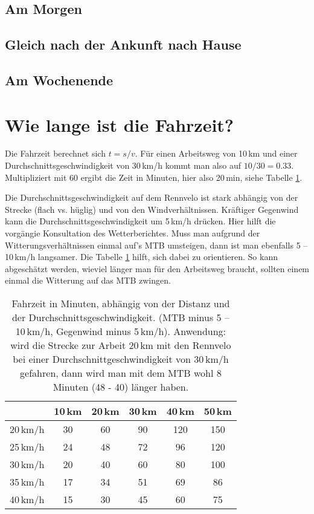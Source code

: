 \subsection{Am Morgen}

\subsection{Gleich nach der Ankunft nach Hause}

\subsection{Am Wochenende}




\section{Wie lange ist die Fahrzeit?}

Die Fahrzeit berechnet sich $t = s/v$.
Für einen Arbeitsweg von 10\,km und einer Durchschnittsgeschwindigkeit von 30\,km/h kommt man also auf $10/30=0.33$.
Multipliziert mit 60 ergibt die Zeit in Minuten, hier also 20\,min, siehe Tabelle \ref{tab:fahrzeit}.

Die Durchschnittsgeschwindigkeit auf dem Rennvelo ist stark abhängig von der Strecke (flach vs. hüglig) und von den Windverhältnissen.
Kräftiger Gegenwind kann die Durchschnittsgeschwindigkeit um 5\,km/h drücken.
Hier hilft die vorgängie Konsultation des Wetterberichtes.
Muss man aufgrund der Witterungsverhältnissen einmal auf's MTB umsteigen, dann ist man ebenfalls 5 -- 10\,km/h langsamer.
Die Tabelle \ref{tab:fahrzeit} hilft, sich dabei zu orientieren.
So kann abgeschätzt werden, wieviel länger man für den Arbeitsweg braucht,
sollten einem einmal die Witterung auf das MTB zwingen.

\begin{table}
        \centering
        \begin{tabular}{cccccc}
                \toprule
            &	10\,km	&   20\,km	& 30\,km	&   40\,km	& 50\,km    \\
    \midrule
20\,km/h	&   30      &	60	    & 90        &   120	    & 150       \\
25\,km/h	&   24      &	48 &	72 &	96 &	120  \\
30\,km/h	&   20      &	40 & 	60& 	80 &	100 \\
35\,km/h	&   17      &	34 &	51& 	69 &	86 \\
40\,km/h	&   15      &	30 &	45& 	60 &	75 \\
\bottomrule
        \end{tabular}
        \caption{Fahrzeit in Minuten, abhängig von der Distanz und der Durchschnittsgeschwindigkeit.
        (MTB minus 5 -- 10\,km/h, Gegenwind minus 5\,km/h).
        Anwendung:
        wird die Strecke zur Arbeit 20\,km mit den Rennvelo bei einer Durchschnittgeschwindigkeit von
        30\,km/h gefahren,
        dann wird man mit dem MTB wohl 8 Minuten (48 - 40) länger haben.}
        \label{tab:fahrzeit}
\end{table}

